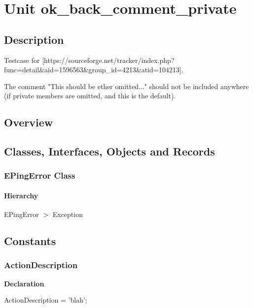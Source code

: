 \documentclass{report}
\begin{document}
\newlength{\tmplength}
\chapter{Unit ok{\_}back{\_}comment{\_}private}
\section{Description}
Testcase for [https://sourceforge.net/tracker/index.php?func=detail{\&}aid=1596563{\&}group{\_}id=4213{\&}atid=104213].

The comment "This should be ether omitted..." should not be included anywhere (if private members are omitted, and this is the default).
\section{Overview}
\begin{description}
\item[\texttt{\begin{ttfamily}EPingError\end{ttfamily} Class}]
\end{description}
\section{Classes, Interfaces, Objects and Records}
\subsection*{EPingError Class}
\subsubsection*{\large{\textbf{Hierarchy}}\normalsize\hspace{1ex}\hfill}
EPingError {$>$} Exception
\section{Constants}
\subsection*{ActionDescription}
\begin{list}{}{
\setlength{\itemindent}{0cm}
\setlength{\listparindent}{0cm}
\setlength{\leftmargin}{\evensidemargin}
\addtolength{\leftmargin}{\tmplength}
\settowidth{\labelsep}{X}
\addtolength{\leftmargin}{\labelsep}
\setlength{\labelwidth}{\tmplength}
}
\begin{flushleft}
\item[\textbf{Declaration}\hfill]
\begin{ttfamily}
ActionDescription = 'blah';\end{ttfamily}


\end{flushleft}
\end{list}
\end{document}
